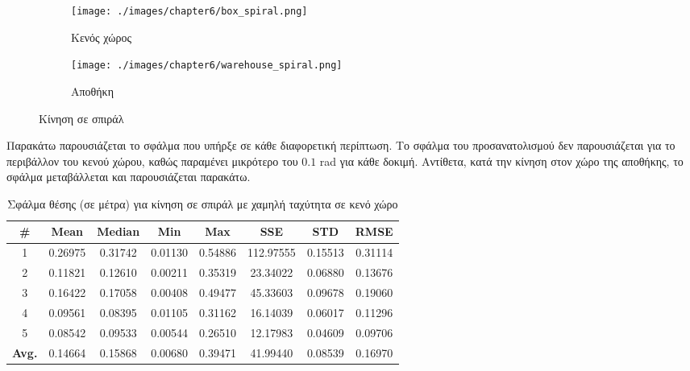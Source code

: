 \begin{figure}[!ht]
        \begin{subfigure}{0.5\textwidth}
            \texttt{[image: ./images/chapter6/box\_spiral.png]}
                \caption{Κενός χώρος}
             \label{fig:box_spiral}
        \end{subfigure}
        \begin{subfigure}{0.5\textwidth}
            \texttt{[image: ./images/chapter6/warehouse\_spiral.png]}
            \caption{Αποθήκη}
            \label{fig:warehouse_spiral}
        \end{subfigure}
        \caption{Κίνηση σε σπιράλ}
        \label{fig:spiral}
\end{figure} 

Παρακάτω παρουσιάζεται το σφάλμα που υπήρξε σε κάθε διαφορετική περίπτωση. Το σφάλμα του προσανατολισμού δεν παρουσιάζεται για το περιβάλλον του κενού χώρου, καθώς παραμένει μικρότερο του $0.1$ rad για κάθε δοκιμή. Αντίθετα, κατά την κίνηση στον χώρο της αποθήκης, το σφάλμα μεταβάλλεται και παρουσιάζεται παρακάτω.

\begin{table}[H]
    \centering
    \caption{Σφάλμα θέσης (σε μέτρα) για κίνηση σε σπιράλ με χαμηλή ταχύτητα σε κενό χώρο}
    \label{tab:position_error_spiral_slow_box}
    \begin{tabular}{| c | c | c | c | c | c | c | c | }
        \hline
        \rowcolor{Gray}
        \# & Mean & Median & Min & Max & SSE & STD & RMSE \\
        \hline
        1 & 0.26975 & 0.31742 & 0.01130 & 0.54886 & 112.97555 & 0.15513 & 0.31114 \\
        2 & 0.11821 & 0.12610 & 0.00211 & 0.35319 & 23.34022 & 0.06880 & 0.13676 \\
        3 & 0.16422 & 0.17058 & 0.00408 & 0.49477 & 45.33603 & 0.09678 & 0.19060 \\
        4 & 0.09561 & 0.08395 & 0.01105 & 0.31162 & 16.14039 & 0.06017 & 0.11296 \\
        5 & 0.08542 & 0.09533 & 0.00544 & 0.26510 & 12.17983 & 0.04609 & 0.09706 \\
        \hline
        \textbf{Avg.} & 0.14664 & 0.15868 & 0.00680 & 0.39471 & 41.99440 & 0.08539 & 0.16970 \\
        \hline
    \end{tabular}
\end{table}

